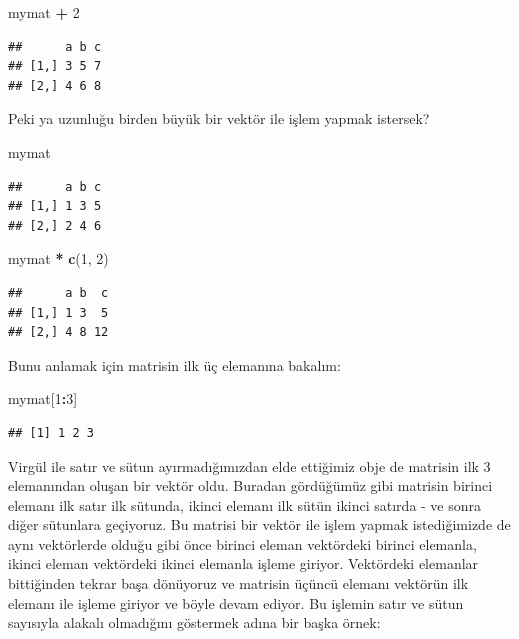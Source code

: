 \documentclass[
]{book}
\newenvironment{Shaded}{\begin{snugshade}}{\end{snugshade}}
\newcommand{\DecValTok}[1]{\textcolor[rgb]{0.00,0.00,0.81}{#1}}
\newcommand{\KeywordTok}[1]{\textcolor[rgb]{0.13,0.29,0.53}{\textbf{#1}}}
\newcommand{\NormalTok}[1]{#1}
\newcommand{\OperatorTok}[1]{\textcolor[rgb]{0.81,0.36,0.00}{\textbf{#1}}}
\newcommand{\StringTok}[1]{\textcolor[rgb]{0.31,0.60,0.02}{#1}}
\begin{document}
\begin{Shaded}
\begin{Highlighting}[]
\NormalTok{mymat }\OperatorTok{+}\StringTok{ }\DecValTok{2}
\end{Highlighting}
\end{Shaded}

\begin{verbatim}
##      a b c
## [1,] 3 5 7
## [2,] 4 6 8
\end{verbatim}

Peki ya uzunluğu birden büyük bir vektör ile işlem yapmak istersek?

\begin{Shaded}
\begin{Highlighting}[]
\NormalTok{mymat}
\end{Highlighting}
\end{Shaded}

\begin{verbatim}
##      a b c
## [1,] 1 3 5
## [2,] 2 4 6
\end{verbatim}

\begin{Shaded}
\begin{Highlighting}[]
\NormalTok{mymat }\OperatorTok{*}\StringTok{ }\KeywordTok{c}\NormalTok{(}\DecValTok{1}\NormalTok{, }\DecValTok{2}\NormalTok{)}
\end{Highlighting}
\end{Shaded}

\begin{verbatim}
##      a b  c
## [1,] 1 3  5
## [2,] 4 8 12
\end{verbatim}

Bunu anlamak için matrisin ilk üç elemanına bakalım:

\begin{Shaded}
\begin{Highlighting}[]
\NormalTok{mymat[}\DecValTok{1}\OperatorTok{:}\DecValTok{3}\NormalTok{]}
\end{Highlighting}
\end{Shaded}

\begin{verbatim}
## [1] 1 2 3
\end{verbatim}

Virgül ile satır ve sütun ayırmadığımızdan elde ettiğimiz obje de matrisin ilk 3 elemanından oluşan bir vektör oldu. Buradan gördüğümüz gibi matrisin birinci elemanı ilk satır ilk sütunda, ikinci elemanı ilk sütün ikinci satırda - ve sonra diğer sütunlara geçiyoruz. Bu matrisi bir vektör ile işlem yapmak istediğimizde de aynı vektörlerde olduğu gibi önce birinci eleman vektördeki birinci elemanla, ikinci eleman vektördeki ikinci elemanla işleme giriyor. Vektördeki elemanlar bittiğinden tekrar başa dönüyoruz ve matrisin üçüncü elemanı vektörün ilk elemanı ile işleme giriyor ve böyle devam ediyor. Bu işlemin satır ve sütun sayısıyla alakalı olmadığını göstermek adına bir başka örnek:
\end{document}
